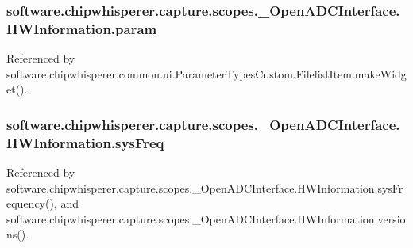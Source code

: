 \subsubsection[{param}]{\setlength{\rightskip}{0pt plus 5cm}software.\+chipwhisperer.\+capture.\+scopes.\+\_\+\+Open\+A\+D\+C\+Interface.\+H\+W\+Information.\+param}\label{classsoftware_1_1chipwhisperer_1_1capture_1_1scopes_1_1__OpenADCInterface_1_1HWInformation_adb570c40c4404dad0e814ad19dde3c9c}


Referenced by software.\+chipwhisperer.\+common.\+ui.\+Parameter\+Types\+Custom.\+Filelist\+Item.\+make\+Widget().

\hypertarget{classsoftware_1_1chipwhisperer_1_1capture_1_1scopes_1_1__OpenADCInterface_1_1HWInformation_a768e93413d8e47f83e93144ff055d30c}{}
\subsubsection[{sys\+Freq}]{\setlength{\rightskip}{0pt plus 5cm}software.\+chipwhisperer.\+capture.\+scopes.\+\_\+\+Open\+A\+D\+C\+Interface.\+H\+W\+Information.\+sys\+Freq}\label{classsoftware_1_1chipwhisperer_1_1capture_1_1scopes_1_1__OpenADCInterface_1_1HWInformation_a768e93413d8e47f83e93144ff055d30c}


Referenced by software.\+chipwhisperer.\+capture.\+scopes.\+\_\+\+Open\+A\+D\+C\+Interface.\+H\+W\+Information.\+sys\+Frequency(), and software.\+chipwhisperer.\+capture.\+scopes.\+\_\+\+Open\+A\+D\+C\+Interface.\+H\+W\+Information.\+versions().

\hypertarget{classsoftware_1_1chipwhisperer_1_1capture_1_1scopes_1_1__OpenADCInterface_1_1HWInformation_ad302158b36d83a818672a6d53768214c}{}
